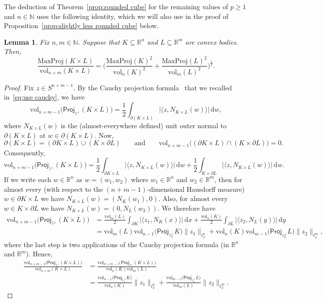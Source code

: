\documentclass[11pt,reqno]{amsart}
\renewcommand{\ge}{\geqslant}
\newcommand{\ud}[0]{\,\mathrm{d}}
\newcommand{\proj}{\mathsf{Proj}}
\newcommand{\R}{\mathbb R}
\newtheorem{lemma}[theorem]{Lemma}
\theoremstyle{remark}
\renewcommand{\subset}{\subseteq}
\newcommand{\N}{\mathbb N}
\newcommand{\vol}{\mathrm{vol}}
\renewcommand{\1}{\mathbf 1}
\begin{document}
The deduction of Theorem~\ref{prop:rounded cube} for the remaining   values of $p\ge 1$ and $n\in \N$ uses the following identity, which we will also use in the proof of Proposition~\ref{prop:slightly less rounded cube} below.


\begin{lemma}\label{lem:product quadratic formula}Fix $n,m\in \N$. Suppose that $K\subset \R^n$ and $L\subset \R^m$ are convex bodies. Then,
$$
\frac{\mathrm{MaxProj}(K\times L)}{\vol_{n+m}(K\times L)}= \bigg(\frac{\mathrm{MaxProj}(K)^2}{\vol_{n}(K)^2}+\frac{\mathrm{MaxProj}(L)^2}{\vol_{m}(L)^2}\bigg)^{\frac12}.
$$
\end{lemma}

\begin{proof} Fix $z\in S^{n+m-1}$. By the Cauchy projection formula~\cite{Gar06} that we recalled in~\eqref{eq:use cauchy}, we have
$$
 \vol_{n+m-1}\big(\proj_{z^\perp}(K\times L)\big)=\frac12 \int_{\partial (K\times L)}\big|\langle z,N_{K\times L}(w)\rangle\big|\ud w,
$$
where $N_{K\times L}(w)$ is the (almost-everywhere defined)  unit outer normal to $\partial (K\times L)$ at $w\in \partial (K\times L)$. Now,
$$
\partial (K\times L)= (\partial K\times L)\cup (K\times \partial L)\qquad\mathrm{and}\qquad \vol_{n+m-1}\big((\partial K\times L)\cap (K\times \partial L)\big)=0.
$$
Consequently,
$$
 \vol_{n+m-1}\big(\proj_{z^\perp}(K\times L)\big)=\frac12 \int_{\partial K\times L}\big|\langle z,N_{K\times L}(w)\rangle\big|\ud w+\frac12 \int_{ K\times\partial L}\big|\langle z,N_{K\times L}(w)\rangle\big|\ud w.
$$
If we write each $w\in \R^n$ as $w=(w_1,w_2)$ where $w_1\in \R^{n}$  and $w_2\in \R^m$,  then for almost every (with respect to the $(n+m-1)$-dimensional Hausdorff measure)  $w\in \partial K\times L$ we have $N_{K\times L}(w)=(N_K(w_1),0)$. Also, for almost every $w\in K\times \partial L$ we have $N_{K\times L}(w)=(0,N_L(w_2))$. We therefore have
\begin{align*}
 \vol_{n+m-1}\big(\proj_{z^\perp}(K\times L)\big)&=\frac{\vol_m(L)}{2}\int_{\partial K} \big|\langle z_1,N_{K}(x)\rangle\big|\ud x+\frac{\vol_n(K)}{2}\int_{\partial L} \big|\langle z_2,N_{ L}(y)\rangle\big|\ud y\\
 &= \vol_m(L)\vol_{n-1}\big(\proj_{z_1^\perp} K\big)\|z_1\|_{\ell_2^n}+\vol_n(K)\vol_{m-1}\big(\proj_{z_2^\perp} L\big)\|z_2\|_{\ell_2^m},
\end{align*}
where the last step is two applications of the Cauchy projection formula (in $\R^n$ and $\R^m$). Hence,
\begin{align*}
\frac{ \vol_{n+m-1}\big(\proj_{z^\perp}(K\times L)\big)}{\vol_{n+m}(K\times L)}&=\frac{ \vol_{n+m-1}\big(\proj_{z^\perp}(K\times L)\big)}{\vol_{n}(K)\vol_m(L)}\\&=\frac{\vol_{n-1}\big(\proj_{z_1^\perp} K\big)}{\vol_{n}(K)}\|z_1\|_{\ell_2^n}+\frac{\vol_{m-1}\big(\proj_{z_2^\perp} L\big)}{\vol_{m}(L)}\|z_2\|_{\ell_2^m}.

\end{align*}
\end{proof}
\end{document}
